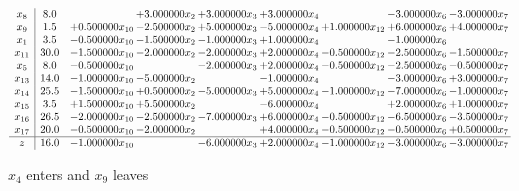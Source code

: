 \documentclass[10pt]{article}
\begin{document}
 \[\begin{array}{c| c c@{\hskip 2pt} c@{\hskip 2pt} c@{\hskip 2pt} c@{\hskip 2pt} c@{\hskip 2pt} c@{\hskip 2pt} c@{\hskip 2pt} }
 x_{8}   &  8.0  &   & + 3.000000 x_{2} & + 3.000000 x_{3} & + 3.000000 x_{4} &   & -3.000000 x_{6} & -3.000000 x_{7}\\
 x_{9}   &  1.5 & + 0.500000 x_{10} & -2.500000 x_{2} & + 5.000000 x_{3} & -5.000000 x_{4} & + 1.000000 x_{12} & + 6.000000 x_{6} & + 4.000000 x_{7}\\
 x_{1}   &  3.5 & -0.500000 x_{10} & -1.500000 x_{2} & -1.000000 x_{3} & + 1.000000 x_{4} &   & -1.000000 x_{6} &   \\
 x_{11}   &  30.0 & -1.500000 x_{10} & -2.000000 x_{2} & -2.000000 x_{3} & + 2.000000 x_{4} & -0.500000 x_{12} & -2.500000 x_{6} & -1.500000 x_{7}\\
 x_{5}   &  8.0 & -0.500000 x_{10} &   & -2.000000 x_{3} & + 2.000000 x_{4} & -0.500000 x_{12} & -2.500000 x_{6} & -0.500000 x_{7}\\
 x_{13}   &  14.0 & -1.000000 x_{10} & -5.000000 x_{2} &   & -1.000000 x_{4} &   & -3.000000 x_{6} & + 3.000000 x_{7}\\
 x_{14}   &  25.5 & -1.500000 x_{10} & + 0.500000 x_{2} & -5.000000 x_{3} & + 5.000000 x_{4} & -1.000000 x_{12} & -7.000000 x_{6} & -1.000000 x_{7}\\
 x_{15}   &  3.5 & + 1.500000 x_{10} & + 5.500000 x_{2} &   & -6.000000 x_{4} &   & + 2.000000 x_{6} & + 1.000000 x_{7}\\
 x_{16}   &  26.5 & -2.000000 x_{10} & -2.500000 x_{2} & -7.000000 x_{3} & + 6.000000 x_{4} & -0.500000 x_{12} & -6.500000 x_{6} & -3.500000 x_{7}\\
 x_{17}   &  20.0 & -0.500000 x_{10} & -2.000000 x_{2} &   & + 4.000000 x_{4} & -0.500000 x_{12} & -0.500000 x_{6} & + 0.500000 x_{7}\\
\hline
z    &  16.0 & -1.000000 x_{10} &   & -6.000000 x_{3} & + 2.000000 x_{4} & -1.000000 x_{12} & -3.000000 x_{6} & -3.000000 x_{7}\\
\end{array}\]


 $ x_{4} $ enters and $ x_{9} $ leaves 
\end{document}
